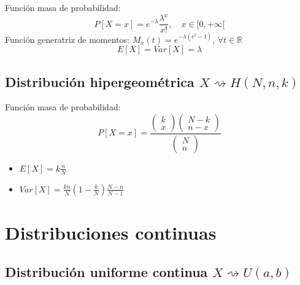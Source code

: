\documentclass[11pt,twoside,titlepage,a4paper]{article}
\theoremstyle{definition}
\theoremstyle{plain_rojo}
\theoremstyle{remark}
\begin{document}
Función masa de probabilidad:
\begin{equation*}
P[X=x]=e^{-\lambda}\frac{\lambda^x}{x!},\quad x\in[0,+\infty[
\end{equation*}
Función generatriz de momentos: $M_x(t)=e^{-\lambda(e^t-1)}$, $\forall t\in\mathbb{R}$
$$E[X]=Var[X]=\lambda$$

\subsection{Distribución hipergeométrica $X\rightsquigarrow H(N,n,k)$}

Función masa de probabilidad:
\begin{equation*}
P[X=x]=\frac{
			\left(\!\begin{array}{c}
			k \\
			x
			\end{array}
			\!\right)
			\left(\!\begin{array}{c}
			N-k \\
			n-x
			\end{array}
			\!\right)}{
			\left(\!\begin{array}{c}
			N \\
			n
			\end{array}
			\!\right)}
\end{equation*}
\begin{multicols}{2}
	\begin{itemize}[label={}]
		\item $E[X]=k\displaystyle\frac nN$
		\item $Var[X]=\displaystyle\frac{kn}{N}(1-\frac kN)\frac{N-n}{N-1}$
	\end{itemize}
\end{multicols}


\section{Distribuciones continuas}

\subsection{Distribución uniforme continua $X\rightsquigarrow U(a,b)$}
\end{document}
